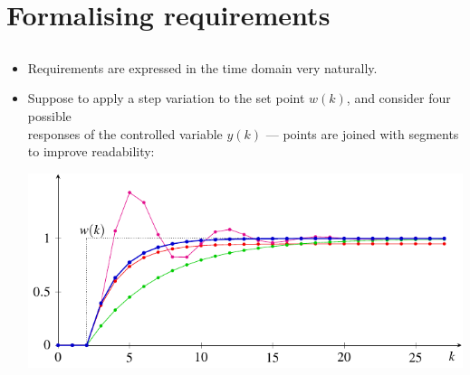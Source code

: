 \section{Formalising requirements}
\subsection{}

\begin{frame}
\framesubtitleTC{}
\myPause
 \begin{itemize}[<+-| alert@+>]
 \item Requirements are expressed in the time domain very naturally.
 \item Suppose to apply a step variation to the set point $w(k)$, and consider four possible\\
       responses of the controlled variable $y(k)$ --- points are joined with segments\\
       to improve readability:
       \begin{center}
        \vspace{2mm}\includegraphics[width=0.60\columnwidth]{./Unit-04/img/StepRespForRequirements.pdf}
       \end{center}
 \end{itemize}
\end{frame}

